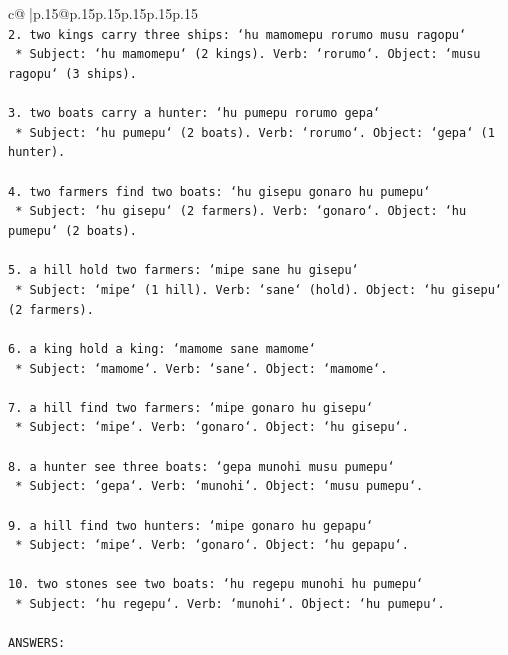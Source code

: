 \documentclass{article}
\begin{document}
{\begin{supertabular}{c@{$\;$}|p{.15\linewidth}@{}p{.15\linewidth}p{.15\linewidth}p{.15\linewidth}p{.15\linewidth}p{.15\linewidth}}
{{{\\ 
\texttt{2.  two kings carry three ships: `hu mamomepu rorumo musu ragopu`} \\
\texttt{    *   Subject: `hu mamomepu` (2 kings). Verb: `rorumo`. Object: `musu ragopu` (3 ships).} \\
\\ 
\texttt{3.  two boats carry a hunter: `hu pumepu rorumo gepa`} \\
\texttt{    *   Subject: `hu pumepu` (2 boats). Verb: `rorumo`. Object: `gepa` (1 hunter).} \\
\\ 
\texttt{4.  two farmers find two boats: `hu gisepu gonaro hu pumepu`} \\
\texttt{    *   Subject: `hu gisepu` (2 farmers). Verb: `gonaro`. Object: `hu pumepu` (2 boats).} \\
\\ 
\texttt{5.  a hill hold two farmers: `mipe sane hu gisepu`} \\
\texttt{    *   Subject: `mipe` (1 hill). Verb: `sane` (hold). Object: `hu gisepu` (2 farmers).} \\
\\ 
\texttt{6.  a king hold a king: `mamome sane mamome`} \\
\texttt{    *   Subject: `mamome`. Verb: `sane`. Object: `mamome`.} \\
\\ 
\texttt{7.  a hill find two farmers: `mipe gonaro hu gisepu`} \\
\texttt{    *   Subject: `mipe`. Verb: `gonaro`. Object: `hu gisepu`.} \\
\\ 
\texttt{8.  a hunter see three boats: `gepa munohi musu pumepu`} \\
\texttt{    *   Subject: `gepa`. Verb: `munohi`. Object: `musu pumepu`.} \\
\\ 
\texttt{9.  a hill find two hunters: `mipe gonaro hu gepapu`} \\
\texttt{    *   Subject: `mipe`. Verb: `gonaro`. Object: `hu gepapu`.} \\
\\ 
\texttt{10. two stones see two boats: `hu regepu munohi hu pumepu`} \\
\texttt{    *   Subject: `hu regepu`. Verb: `munohi`. Object: `hu pumepu`.} \\
\\ 
\texttt{ANSWERS:} \\
}}}
\end{supertabular}}
\end{document}
